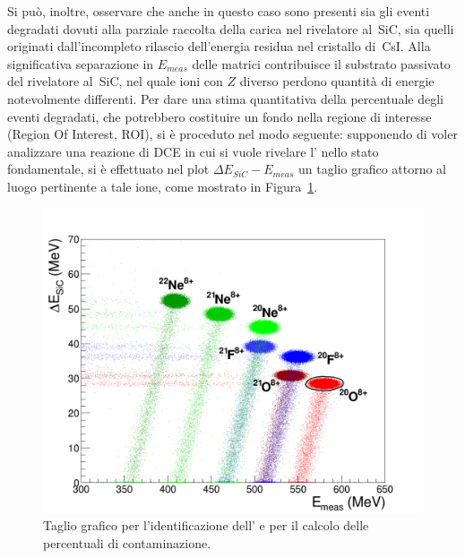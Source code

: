 Si può, inoltre, osservare che anche in questo caso sono presenti sia gli eventi degradati dovuti alla parziale raccolta della carica nel rivelatore al~SiC, sia quelli originati dall'incompleto rilascio dell'energia residua nel cristallo di~CsI.
Alla significativa separazione in $E_{meas}$ delle matrici contribuisce il substrato passivato del rivelatore al~SiC, nel quale ioni con $Z$ diverso perdono quantità di energie notevolmente differenti.
Per dare una stima quantitativa della percentuale degli eventi degradati, che potrebbero costituire un fondo nella regione di interesse (Region Of Interest, ROI), si è proceduto nel modo seguente: supponendo di voler analizzare una reazione di DCE in cui si vuole rivelare l' nello stato fondamentale, si è effettuato nel plot $\Delta E_{SiC} - E_{meas}$ un taglio grafico attorno al luogo pertinente a tale ione, come mostrato in Figura~\ref{fig:deltaE_Emeas_taglio}.
\begin{figure} [!p]
	\centering
	\includegraphics[width=\textwidth, keepaspectratio]{Grafici_Tesi2/PIDnew/deltaE_Emeas_quadrata_taglio_menoeventi2.png}
	\caption{Taglio grafico per l'identificazione dell' e per il calcolo delle percentuali di contaminazione.} \label{fig:deltaE_Emeas_taglio}
\end{figure}

